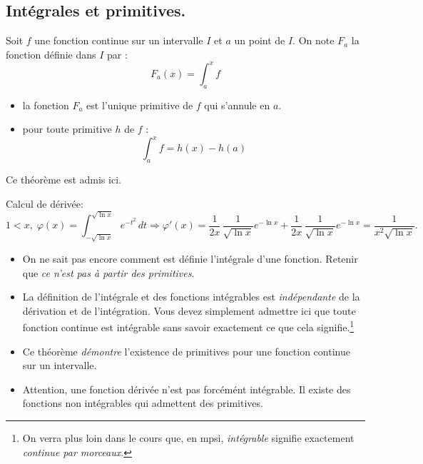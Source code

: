 \subsection{Intégrales et primitives.}
\begin{thm}
Soit $f$ une fonction continue sur un intervalle $I$ et $a$ un point de $I$. On note $F_a$ la fonction définie dans $I$ par :
\begin{displaymath}
 F_a(x)=\int _a ^x f
\end{displaymath}
\begin{itemize}
 \item la fonction $F_a$ est l'unique primitive de $f$ qui s'annule en $a$.
\item pour toute primitive $h$ de $f$ :
\begin{displaymath}
 \int _a ^x f =h(x)-h(a)
\end{displaymath}
\end{itemize}
\end{thm}
\begin{demo}
  Ce théorème est admis ici.
\end{demo}
\begin{exple}
 Calcul de dérivée:
\[
 1<x, \;\varphi(x) = \int_{-\sqrt{\ln x}}^{\sqrt{\ln x}}e^{-t^2}\,dt
 \Rightarrow \varphi'(x) = \frac{1}{2x}\,\frac{1}{\sqrt{\ln x}} e^{-\ln x} + \frac{1}{2x}\,\frac{1}{\sqrt{\ln x}} e^{-\ln x}
 = \frac{1}{x^2 \sqrt{\ln x}}.
\]
\end{exple}

\begin{rems}
\begin{itemize}
 \item On ne sait pas encore comment est définie l'intégrale d'une fonction. Retenir que \emph{ce n'est pas à partir des primitives}.
 \item La définition de l'intégrale et des fonctions intégrables est \emph{indépendante} de la dérivation et de l'intégration. Vous devez simplement admettre ici que toute fonction continue est intégrable sans savoir exactement ce que cela signifie.\footnote{On verra plus loin dans le cours que, en mpsi, \emph{intégrable} signifie exactement \emph{continue par morceaux}.} 
 \item Ce théorème \emph{démontre} l'existence de primitives pour une fonction continue sur un intervalle.
 \item Attention, une fonction dérivée n'est pas forcémént intégrable. Il existe des fonctions non intégrables qui admettent des primitives.
\end{itemize}
\end{rems}

